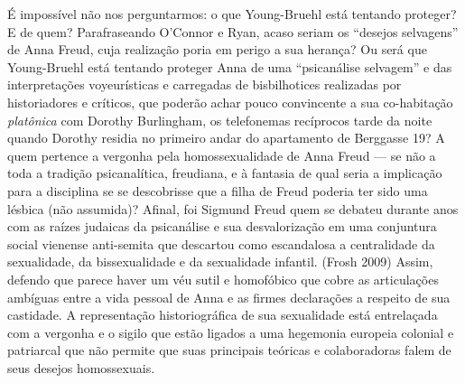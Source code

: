 É impossível não nos perguntarmos: o que Young-Bruehl está tentando
proteger? E de quem? Parafraseando O'Connor e Ryan, acaso seriam os
``desejos selvagens'' de Anna Freud, cuja realização poria em perigo a sua
herança? Ou será que Young-Bruehl está tentando proteger Anna de uma
``psicanálise selvagem'' e das interpretações voyeurísticas e carregadas
de bisbilhotices realizadas por historiadores e críticos, que poderão
achar pouco convincente a sua co-habitação \emph{platônica} com Dorothy
Burlingham, os telefonemas recíprocos tarde da noite quando Dorothy
residia no primeiro andar do apartamento de Berggasse 19? A quem
pertence a vergonha pela homossexualidade de Anna Freud --- se não a toda
a tradição psicanalítica, freudiana, e à fantasia de qual seria a
implicação para a disciplina se se descobrisse que a filha de Freud
poderia ter sido uma lésbica (não assumida)? Afinal, foi Sigmund Freud
quem se debateu durante anos com as raízes judaicas da psicanálise e sua
desvalorização em uma conjuntura social vienense anti-semita que
descartou como escandalosa a centralidade da sexualidade, da
bissexualidade e da sexualidade infantil. (Frosh 2009) Assim, defendo
que parece haver um véu sutil e homofóbico que cobre as articulações
ambíguas entre a vida pessoal de Anna e as firmes declarações a respeito
de sua castidade. A representação historiográfica de sua sexualidade
está entrelaçada com a vergonha e o sigilo que estão ligados a uma
hegemonia europeia colonial e patriarcal que não permite que suas
principais teóricas e colaboradoras falem de seus desejos homossexuais.


